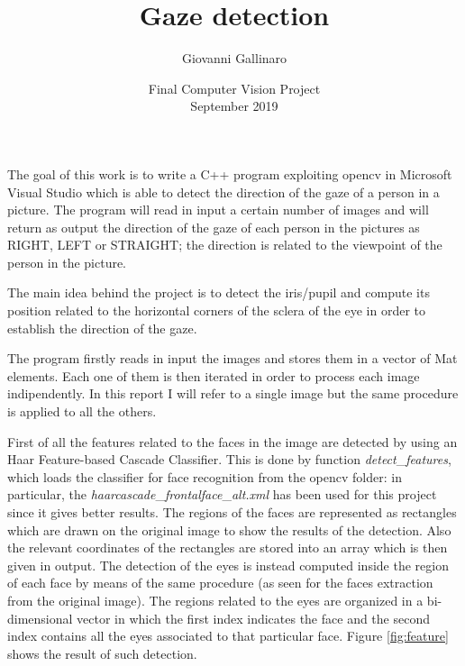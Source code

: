 \documentclass[14pt,a4paper]{extreport}
\title{Gaze detection}
\date{Final Computer Vision Project\\ September 2019}
\author{Giovanni Gallinaro}
\begin{document}
\maketitle

The goal of this work is to write a C++ program exploiting opencv in Microsoft Visual Studio which is able to detect the direction of the gaze of a person in a picture. The program will read in input a certain number of images and will return as output the direction of the gaze of each person in the pictures as RIGHT, LEFT or STRAIGHT; the direction is related to the viewpoint of the person in the picture.

The main idea behind the project is to detect the iris/pupil and compute its position related to the horizontal corners of the sclera of the eye in order to establish the direction of the gaze.

The program firstly reads in input the images and stores them in a vector of Mat elements. Each one of them is then iterated in order to process each image indipendently. In this report I will refer to a single image but the same procedure is applied to all the others.

First of all the features related to the faces in the image are detected by using an Haar Feature-based Cascade Classifier. This is done by function \textit{detect}\_\textit{features}, which loads the classifier for face recognition from the opencv folder: in particular, the \textit{haarcascade}\_\textit{frontalface}\_\textit{alt.xml} has been used for this project since it gives better results. The regions of the faces are represented as rectangles which are drawn on the original image to show the results of the detection. Also the relevant coordinates of the rectangles are stored into an array which is then given in output. The detection of the eyes is instead computed inside the region of each face by means of the same procedure (as seen for the faces extraction from the original image). The regions related to the eyes are organized in a bi-dimensional vector in which the first index indicates the face and the second index contains all the eyes associated to that particular face. Figure \ref{fig:feature} shows the result of such detection.
\end{document}
